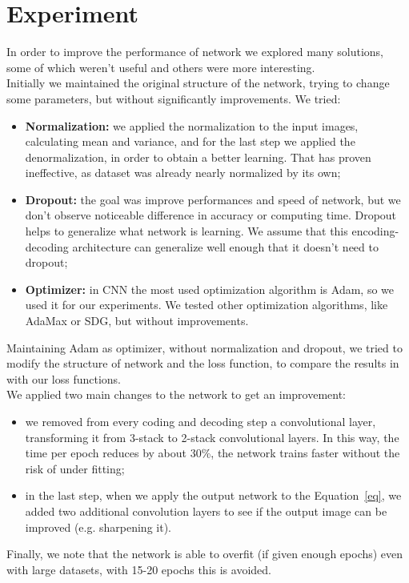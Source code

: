 \documentclass[11pt, a4paper]{article}
\begin{document}
	\section{Experiment}
	In order to improve the performance of network we explored many solutions, some of which weren't useful and others were more interesting.\\
	Initially we maintained the original structure of the network, trying to change some parameters, but without significantly improvements. We tried:
	\begin{itemize}
		\item \textbf{Normalization:} we applied the normalization to the input images, calculating mean and variance, and for the last step we applied the denormalization, in order to obtain a better learning. That has proven ineffective, as dataset was already nearly normalized by its own;
		\item \textbf{Dropout:} the goal was improve performances and speed of network, but we don't observe noticeable difference in accuracy or computing time. Dropout helps to generalize what network is learning. We assume that this encoding-decoding architecture can generalize well enough that it doesn't need to dropout; 
		\item \textbf{Optimizer:} in CNN the most used optimization algorithm is Adam, so we used it for our experiments. We tested other optimization algorithms, like AdaMax or SDG, but without improvements.
	\end{itemize}
	Maintaining Adam as optimizer, without normalization and dropout, we tried to modify the structure of network and the loss function, to compare the results in \cite{mainpaper} with our loss functions.\\
	We applied two main changes to the network to get an improvement:
	\begin{itemize}
		\item we removed from every coding and decoding step a convolutional layer, transforming it from 3-stack to 2-stack convolutional layers. In this way, the time per epoch reduces by about 30\%, the network trains faster without the risk of under fitting;
		\item in the last step, when we apply the output network to the Equation~\ref{eq}, we added two additional convolution layers to see if the output image can be improved (e.g. sharpening it). 
	\end{itemize}
	Finally, we note that the network is able to overfit (if given enough epochs) even with large datasets, with 15-20 epochs this is avoided.
	
\end{document}
